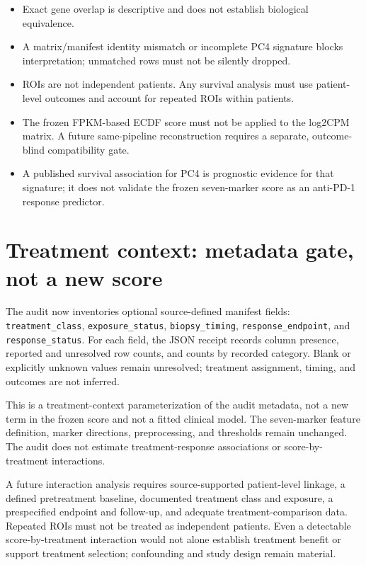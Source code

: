 \documentclass[11pt]{article}
\begin{document}
\begin{itemize}[leftmargin=1.5em]
  \item Exact gene overlap is descriptive and does not establish biological equivalence.
  \item A matrix/manifest identity mismatch or incomplete PC4 signature blocks interpretation; unmatched rows must not be silently dropped.
  \item ROIs are not independent patients. Any survival analysis must use patient-level outcomes and account for repeated ROIs within patients.
  \item The frozen FPKM-based ECDF score must not be applied to the log2CPM matrix. A future same-pipeline reconstruction requires a separate, outcome-blind compatibility gate.
  \item A published survival association for PC4 is prognostic evidence for that signature; it does not validate the frozen seven-marker score as an anti-PD-1 response predictor.
\end{itemize}

\section{Treatment context: metadata gate, not a new score}

The audit now inventories optional source-defined manifest fields:
\texttt{treatment\_class}, \texttt{exposure\_status},
\texttt{biopsy\_timing}, \texttt{response\_endpoint}, and
\texttt{response\_status}. For each field, the JSON receipt records column
presence, reported and unresolved row counts, and counts by recorded category.
Blank or explicitly unknown values remain unresolved; treatment assignment,
timing, and outcomes are not inferred.

This is a treatment-context parameterization of the audit metadata, not a new
term in the frozen score and not a fitted clinical model. The seven-marker
feature definition, marker directions, preprocessing, and thresholds remain
unchanged. The audit does not estimate treatment-response associations or
score-by-treatment interactions.

A future interaction analysis requires source-supported patient-level linkage,
a defined pretreatment baseline, documented treatment class and exposure,
a prespecified endpoint and follow-up, and adequate treatment-comparison data.
Repeated ROIs must not be treated as independent patients. Even a detectable
score-by-treatment interaction would not alone establish treatment benefit or
support treatment selection; confounding and study design remain material.
\end{document}
